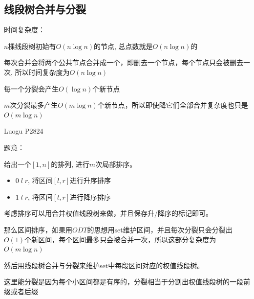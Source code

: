 \subsection{线段树合并与分裂}

时间复杂度：\par
$n$棵线段树初始有$O(n\log n)$的节点, 总点数就是$O(n \log n)$的\par
每次合并会将两个公共节点合并成一个，即删去一个节点，每个节点只会被删去一次, 所以时间复杂度为$O(n\log n)$\par

每一个分裂会产生$O(\log n)$个新节点\par
$m$次分裂最多产生$O(m\log n)$个新节点，所以即使降它们全部合并复杂度也只是$O(m\log n)$\par

Luogu P2824\par
题意：\par
给出一个$[1, n]$的排列, 进行$m$次局部排序。\par
\begin{itemize}
\item $0\;l\;r$, 将区间$[l, r]$进行升序排序
\item $1\;l\;r$, 将区间$[l, r]$进行降序排序
\end{itemize}

考虑排序可以用合并权值线段树来做，并且保存升/降序的标记即可。\par
那么区间排序，如果用$ODT$的思想用set维护区间，并且每次分裂只会分裂出$O(1)$个新区间，每个区间最多只会被合并一次，所以这部分复杂度为$O(m \log n)$\par
然后用线段树合并与分裂来维护set中每段区间对应的权值线段树。\par
这里能分裂是因为每个小区间都是有序的，分裂相当于分割出权值线段树的一段前缀或者后缀\par

